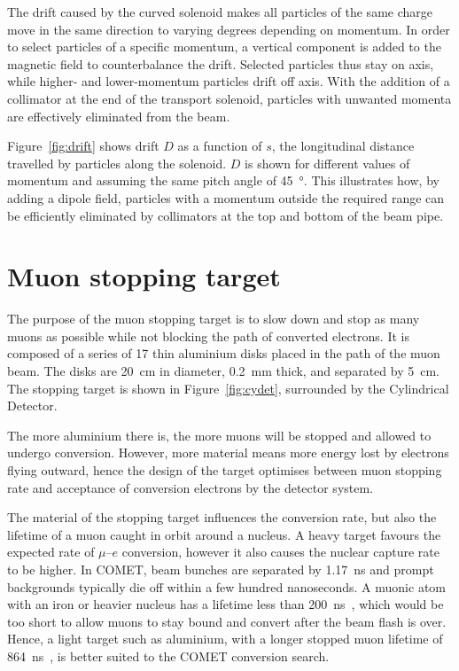 The drift caused by the curved solenoid makes all particles of the same charge
move in the same direction to varying degrees depending on momentum. In order to
select particles of a specific momentum, a vertical component is added to the
magnetic field to counterbalance the drift. Selected particles thus stay on
axis, while higher- and lower-momentum particles drift off axis. With the addition
of a collimator at the end of the transport solenoid, particles with unwanted
momenta are effectively eliminated from the beam.

Figure~\ref{fig:drift} shows drift $D$ as a function of $s$, the longitudinal
distance travelled by particles along the solenoid. $D$ is shown for different
values of momentum and assuming the same pitch angle of \SI{45}{\degree}. This
illustrates how, by adding a dipole field, particles with a momentum outside the
required range can be efficiently eliminated by collimators at the top and
bottom of the beam pipe.

\section{Muon stopping target}\label{sec:stopping_target}
The purpose of the muon stopping target is to slow down and stop as many muons
as possible while not blocking the path of converted electrons. It is composed
of a series of 17 thin aluminium disks placed in the path of the muon beam. The
disks are \SI{20}{\cm} in diameter, \SI{0.2}{\mm} thick, and separated by
\SI{5}{\cm}. The stopping target is shown in Figure~\ref{fig:cydet}, surrounded
by the Cylindrical Detector.

The more aluminium there is, the more muons will be stopped and allowed to
undergo conversion. However, more material means more energy lost by electrons
flying outward, hence the design of the target optimises between muon stopping
rate and acceptance of conversion electrons by the detector system.


The material of the stopping target influences the conversion rate, but also the
lifetime of a muon caught in orbit around a nucleus. A heavy target favours the
expected rate of $\mu$--$e$ conversion, however it also causes the nuclear
capture rate to be higher. In COMET, beam bunches are separated by
\SI{1.17}{\ns} and prompt backgrounds typically die off within a few hundred
nanoseconds. A muonic atom with an iron or heavier nucleus has a lifetime less
than \SI{200}{\ns}~\cite{ben_thesis}, which would be too short to allow muons to
stay bound and convert after the beam flash is over. Hence, a light target such
as aluminium, with a longer stopped muon lifetime of
\SI{864}{\ns}~\cite{PhysRevC.35.2212}, is better suited to the COMET conversion
search.

